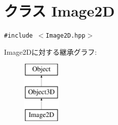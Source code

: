 \hypertarget{classm3g_1_1Image2D}{
\section{クラス Image2D}
\label{classm3g_1_1Image2D}
}
{\tt \#include $<$Image2D.hpp$>$}

Image2Dに対する継承グラフ:\begin{figure}[H]
\begin{center}
\leavevmode
\includegraphics[height=3cm]{classm3g_1_1Image2D}
\end{center}
\end{figure}
